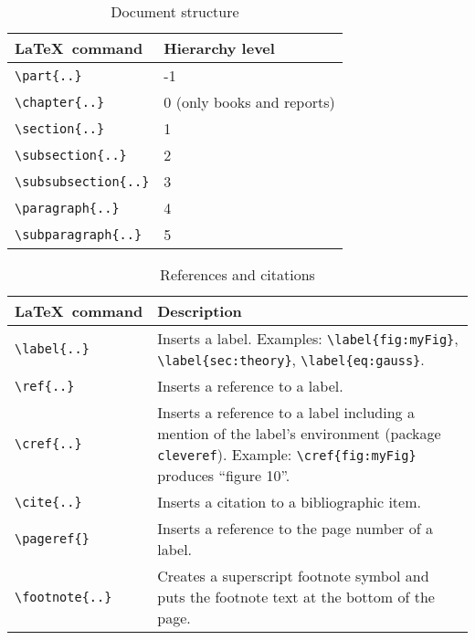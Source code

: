 \documentclass{article}
\begin{document}
\begin{table}[htbp]
\caption{Document structure}
\begin{tabularx}{\textwidth}{ll}
\toprule
\LaTeX~command & Hierarchy level \\
\midrule
\verb|\part|\verb|{..}| & -1\\
\verb|\chapter|\verb|{..}| & 0 (only books and reports)\\
\verb|\section|\verb|{..}| & 1\\
\verb|\subsection|\verb|{..}| & 2\\
\verb|\subsubsection|\verb|{..}| & 3\\
\verb|\paragraph|\verb|{..}| & 4\\
\verb|\subparagraph|\verb|{..}| & 5\\
\bottomrule
\end{tabularx}
\end{table}

\begin{table}[htbp]
\caption{References and citations}
\begin{tabularx}{\textwidth}{lX}
\toprule
\LaTeX~command & Description\\
\midrule
\verb|\label|\verb|{..}| & Inserts a label. Examples: \verb|\label|\verb|{fig:myFig}|, \verb|\label|\verb|{sec:theory}|, \verb|\label{eq:gauss}|.\\
\verb|\ref|\verb|{..}| & Inserts a reference to a label.\\
\verb|\cref|\verb|{..}| & Inserts a reference to a label including a mention of the label's environment (package \verb|cleveref|). Example: \verb|\cref|\verb|{fig:myFig}| produces ``figure 10''. \\
\verb|\cite|\verb|{..}| & Inserts a citation to a bibliographic item.\\
\verb|\pageref|\verb|{}| & Inserts a reference to the page number of a label.\\
\verb|\footnote|\verb|{..}| & Creates a superscript footnote symbol and puts the footnote text at the bottom of the page.\\
\bottomrule
\end{tabularx}
\end{table}
\end{document}
